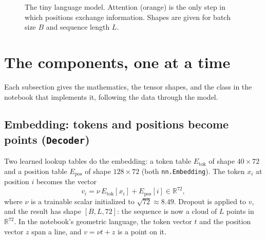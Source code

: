 \documentclass[11pt]{article}
\newcommand{\code}[1]{\texttt{#1}}
\newcommand{\R}{\mathbb{R}}
\newcommand{\Etok}{E_{\text{tok}}}
\newcommand{\Epos}{E_{\text{pos}}}
\begin{document}
\begin{figure}[p]
\caption{The tiny language model. Attention (orange) is the only step
  in which positions exchange information. Shapes are given for batch size $B$ and
  sequence length $L$.}
\label{fig:arch}
\end{figure}

\section{The components, one at a time}

Each subsection gives the mathematics, the tensor shapes, and the class in the
notebook that implements it, following the data through the model.

\subsection{Embedding: tokens and positions become points (\code{Decoder})}

Two learned lookup tables do the embedding: a token table $\Etok$ of shape
$40\times72$ and a position table $\Epos$ of shape $128\times72$ (both
\code{nn.Embedding}). The token $x_i$ at position $i$ becomes the vector
\begin{equation}
  v_i=\nu\,\Etok[x_i]+\Epos[i]\in\R^{72},
\end{equation}
where $\nu$ is a trainable scalar initialized to $\sqrt{72}\approx8.49$. Dropout is
applied to $v$, and the result has shape $[B,L,72]$: the sequence is now a cloud of
$L$ points in $\R^{72}$. In the notebook's geometric language, the token vector $t$
and the position vector $z$ span a line, and $v=\nu t+z$ is a point on it.
\end{document}
